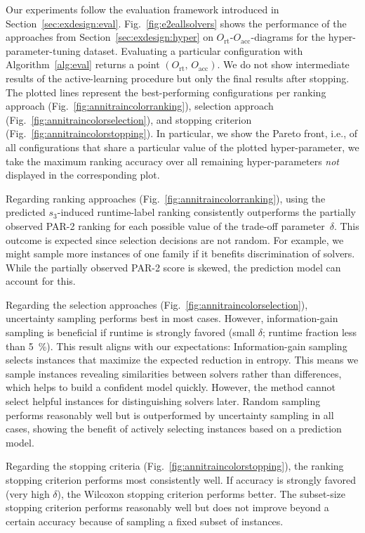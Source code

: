 \documentclass[sn-basic, Numbered]{sn-jnl} %
\begin{document}
Our experiments follow the evaluation framework introduced in Section~\ref{sec:exdesign:eval}.
Fig.~\ref{fig:e2eallsolvers} shows the performance of the approaches from Section~\ref{sec:exdesign:hyper} on $O_{\operatorname{rt}}$-$O_{\operatorname{acc}}$-diagrams for the hyper-parameter-tuning dataset.
Evaluating a particular configuration with Algorithm~\ref{alg:eval} returns a point $\left(O_{\operatorname{rt}},\, O_{\operatorname{acc}}\right)$.
We do not show intermediate results of the active-learning procedure but only the final results after stopping.
The plotted lines represent the best-performing configurations per ranking approach (Fig.~\ref{fig:annitraincolorranking}), selection approach (Fig.~\ref{fig:annitraincolorselection}), and stopping criterion (Fig.~\ref{fig:annitraincolorstopping}).
In particular, we show the Pareto front, i.e., of all configurations that share a particular value of the plotted hyper-parameter, we take the maximum ranking accuracy over all remaining hyper-parameters \emph{not} displayed in the corresponding plot.

Regarding ranking approaches (Fig.~\ref{fig:annitraincolorranking}), using the predicted $s_3$-induced run\-time-label rank\-ing consistently outperforms the partially observed PAR-2 ranking for each possible value of the trade-off parameter~$\delta$.
This outcome is expected since selection decisions are not random.
For example, we might sample more instances of one family if it benefits discrimination of solvers.
While the partially observed PAR-2 score is skewed, the prediction model can account for this.

Regarding the selection approaches (Fig.~\ref{fig:annitraincolorselection}), uncertainty sampling performs best in most cases.
However, information-gain sampling is beneficial if runtime is strongly favored (small $\delta$; runtime fraction less than \SI{5}{\%}).
This result aligns with our expectations:
Information-gain sampling selects instances that maximize the expected reduction in entropy.
This means we sample instances revealing similarities between solvers rather than differences, which helps to build a confident model quickly.
However, the method cannot select helpful instances for distinguishing solvers later.
Random sampling performs reasonably well but is outperformed by uncertainty sampling in all cases, showing the benefit of actively selecting instances based on a prediction model.

Regarding the stopping criteria (Fig.~\ref{fig:annitraincolorstopping}), the ranking stopping criterion performs most consistently well.
If accuracy is strongly favored (very high $\delta$), the Wilcoxon stopping criterion performs better.
The subset-size stopping criterion performs reasonably well but does not improve beyond a certain accuracy because of sampling a fixed subset of instances.
\end{document}
